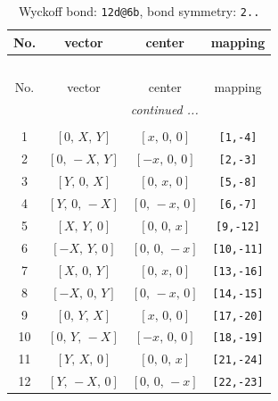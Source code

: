 \documentclass[fleqn,8pt]{jsarticle}
\begin{document}
\begin{longtable}{cccc}
\caption{Wyckoff bond: {\tt 12d@6b}, bond symmetry: {\tt 2..}}
 \\
 \hline \hline
No. & vector & center & mapping \\ \hline \endfirsthead

\multicolumn{3}{l}{\tablename\ \thetable{}} \\
 \hline \hline
No. & vector & center & mapping \\ \hline \endhead

 \hline \hline
\multicolumn{3}{r}{\footnotesize\it continued ...} \\ \endfoot

 \hline \hline
\multicolumn{3}{r}{} \\ \endlastfoot

1 & $\left[ 0,\, X,\, Y \right]$ & $\left[ x,\, 0,\, 0 \right]$ & {\tt [1,-4]} \\ \hline
2 & $\left[ 0,\, - X,\, Y \right]$ & $\left[ - x,\, 0,\, 0 \right]$ & {\tt [2,-3]} \\ \hline
3 & $\left[ Y,\, 0,\, X \right]$ & $\left[ 0,\, x,\, 0 \right]$ & {\tt [5,-8]} \\ \hline
4 & $\left[ Y,\, 0,\, - X \right]$ & $\left[ 0,\, - x,\, 0 \right]$ & {\tt [6,-7]} \\ \hline
5 & $\left[ X,\, Y,\, 0 \right]$ & $\left[ 0,\, 0,\, x \right]$ & {\tt [9,-12]} \\ \hline
6 & $\left[ - X,\, Y,\, 0 \right]$ & $\left[ 0,\, 0,\, - x \right]$ & {\tt [10,-11]} \\ \hline
7 & $\left[ X,\, 0,\, Y \right]$ & $\left[ 0,\, x,\, 0 \right]$ & {\tt [13,-16]} \\ \hline
8 & $\left[ - X,\, 0,\, Y \right]$ & $\left[ 0,\, - x,\, 0 \right]$ & {\tt [14,-15]} \\ \hline
9 & $\left[ 0,\, Y,\, X \right]$ & $\left[ x,\, 0,\, 0 \right]$ & {\tt [17,-20]} \\ \hline
10 & $\left[ 0,\, Y,\, - X \right]$ & $\left[ - x,\, 0,\, 0 \right]$ & {\tt [18,-19]} \\ \hline
11 & $\left[ Y,\, X,\, 0 \right]$ & $\left[ 0,\, 0,\, x \right]$ & {\tt [21,-24]} \\ \hline
12 & $\left[ Y,\, - X,\, 0 \right]$ & $\left[ 0,\, 0,\, - x \right]$ & {\tt [22,-23]} \\
\end{longtable}
\renewcommand{\arraystretch}{1.2}
\end{document}
